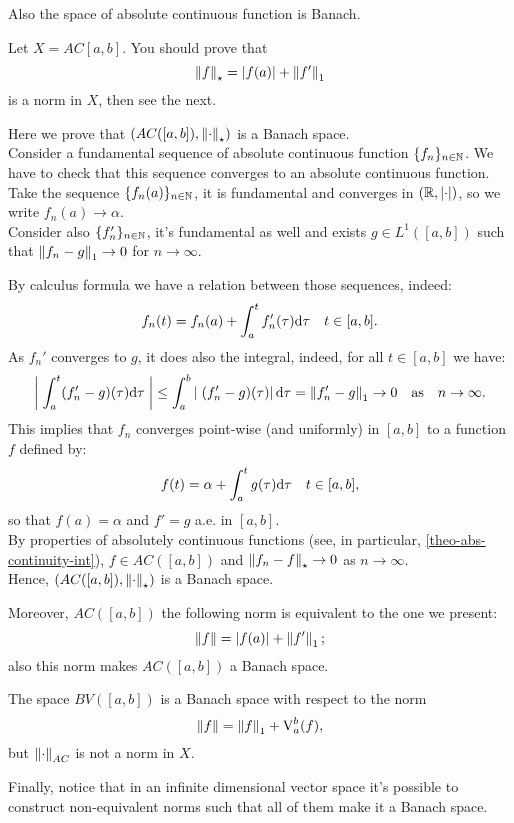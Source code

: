 Also the space of absolute continuous function is Banach.
\begin{exam}
	Let $X = AC[a,b]$. You should prove that 
	$$
	\left\lVert f\right\rVert_\star 
	= |f(a)| + \left\lVert f'\right\rVert_1
	$$ 
	is a norm in $X$, then see the next.
	
	Here we prove that $(AC([a,b]), \left\lVert\cdot\right\rVert_\star)$ is a Banach space.\\
	Consider a fundamental sequence of absolute continuous function $\{f_n\}_{n\in \mathbb N}$. We have to check that this sequence converges to an absolute continuous function.\\
	Take the sequence $\{f_n(a)\}_{n\in\mathbb N}$, it is fundamental and converges in $(\mathbb R, \left\lvert\cdot\right\rvert)$, so we write $f_n(a) \to \alpha$.\\
	Consider also $\{f_n'\}_{n\in\mathbb N}$, it's fundamental as well and exists $g \in L^1([a,b])$ such that $\left\lVert f_n - g\right\rVert_1 \to 0$ for $n \to \infty$.
	
	By calculus formula we have a relation between those sequences, indeed:
	$$
	f_n(t) 
	= f_n(a) + \int_a^t f_n'(\tau) \mathrm d \tau 
	\quad t 
	\in [a,b]
	.
	$$
	As $f_n'$ converges to $g$, it does also the integral, indeed, for all $t \in [a,b]$ we have:
	$$
	\left| \; \int_a^t(f_n'-g)(\tau) \mathrm d \tau \; \right|
	\leq \int_a^b \left | \; (f_n'-g)(\tau) \right| \mathrm d \tau
	=  \left\lVert f_n' -g\right\rVert_1 \to 0
	\quad \text{as}
	\quad n
	\to \infty
	.
	$$
	This implies that $f_n$ converges point-wise (and uniformly) in $[a,b]$ to a function $f$ defined by:
	$$
	f(t) 
	= \alpha + \int_a^t g(\tau)\mathrm d\tau
	\quad t 
	\in [a,b]
	,
	$$
	so that $f(a)= \alpha$ and $f' = g$ a.e. in $[a,b]$.\\
	By properties of absolutely continuous functions (see, in particular, \vref{theo-abs-continuity-int}), $f \in AC([a,b])$ and $\left\lVert f_n - f\right\rVert_\star \to 0$ as $n \to \infty$.\\
	Hence, $(AC([a,b]), \left\lVert\cdot\right\rVert_\star)$ is a Banach space.
	
	Moreover, $AC([a,b])$ the following norm is equivalent to the one we present:
	$$
	\left\lVert f\right\rVert 
	= |f(a)| + \left\lVert f'\right\rVert_1
	;
	$$
	also this norm makes $AC([a,b])$ a Banach space.
\end{exam}

\begin{exam}
		The space $BV([a,b])$ is a Banach space with respect to the norm 
		$$
		\left\lVert f\right\rVert 
		= \left\lVert f\right\rVert_1 + \operatorname{V}^b_a (f)
		,
		$$
		but $\left\lVert\cdot\right\rVert_{AC}$ is not a norm in $X$.
\end{exam}


Finally, notice that in an infinite dimensional vector space it's possible to construct non-equivalent norms such that all of them make it a Banach space.


